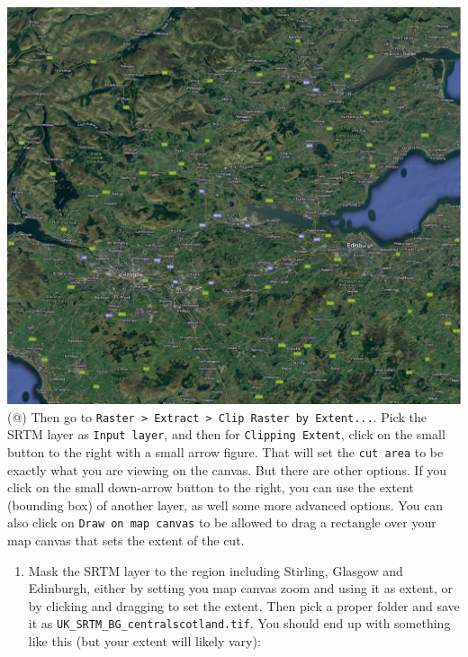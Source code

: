\documentclass[
  letterpaper,
  DIV=11,
  numbers=noendperiod]{scrreprt}
\providecommand{\tightlist}{%
  \setlength{\itemsep}{0pt}\setlength{\parskip}{0pt}}\usepackage{longtable,booktabs,array}
\begin{document}
\includegraphics{images/lab_5/lab5_fig4_stirglaedi.jpg} (@) Then go to
\texttt{Raster\ \textgreater{}\ Extract\ \textgreater{}\ Clip\ Raster\ by\ Extent...}.
Pick the SRTM layer as \texttt{Input\ layer}, and then for
\texttt{Clipping\ Extent}, click on the small button to the right with a
small arrow figure. That will set the \texttt{cut\ area} to be exactly
what you are viewing on the canvas. But there are other options. If you
click on the small down-arrow button to the right, you can use the
extent (bounding box) of another layer, as well some more advanced
options. You can also click on \texttt{Draw\ on\ map\ canvas} to be
allowed to drag a rectangle over your map canvas that sets the extent of
the cut.

\begin{enumerate}
\def\labelenumi{(\arabic{enumi})}
\setcounter{enumi}{148}
\tightlist
\item
  Mask the SRTM layer to the region including Stirling, Glasgow and
  Edinburgh, either by setting you map canvas zoom and using it as
  extent, or by clicking and dragging to set the extent. Then pick a
  proper folder and save it as
  \texttt{UK\_SRTM\_BG\_centralscotland.tif}. You should end up with
  something like this (but your extent will likely vary):
\end{enumerate}
\end{document}
